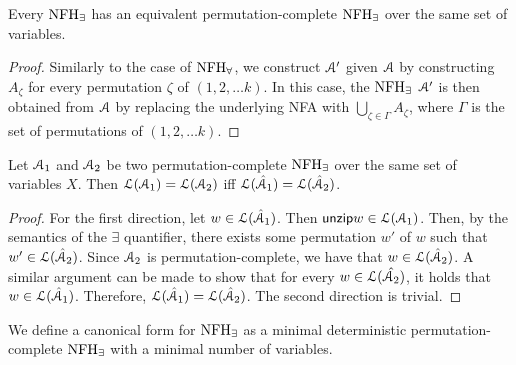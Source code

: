 \begin{lemma}
Every $\textrm{NFH}_{\exists}$ has an equivalent permutation-complete $\textrm{NFH}_{\exists}$ over the same set of variables. 
\end{lemma}
\begin{proof}
Similarly to the case of $\textrm{NFH}_{\forall}$, we construct $\mathcal{A}'$ given $\mathcal{A}$ by constructing $A_\zeta$ for every permutation $\zeta$ of $(1,2,\ldots k)$.
In this case, the $\textrm{NFH}_{\exists}$ $\mathcal{A}'$ is then obtained from $\mathcal{A}$ by replacing the underlying NFA with $\bigcup_{\zeta\in\Gamma} A_\zeta$, where $\Gamma$ is the set of permutations of $(1,2,\ldots k)$.
\end{proof}

\begin{lemma}
Let $\mathcal{A}_1$ and $\mathcal{A}_2$ be two permutation-complete $\textrm{NFH}_{\exists}$ over the same set of variables $X$.
Then $\mathcal{L}(\mathcal{A}_1)=\mathcal{L}(\mathcal{A}_2)$ iff  $\mathcal{L}(\hat{\mathcal{A}}_1) = \mathcal{L}(\hat {\mathcal{A}}_2)$.
\end{lemma}
\begin{proof}
For the first direction, let $w\in\mathcal{L}(\hat{\mathcal{A}}_1)$. Then $\mathsf{unzip}{w}\in\mathcal{L}(\mathcal{A}_1)$. 
Then, by the semantics of the $\exists$ quantifier, there exists some permutation $w'$ of $w$ such that $w'\in\mathcal{L}(\hat{\mathcal{A}}_2)$.
Since $\mathcal{A}_2$ is permutation-complete, we have that $w\in\mathcal{L}(\hat{\mathcal{A}}_2)$. A similar argument can be made to show that for every $w\in\mathcal{L}(\hat{\mathcal{A}_2})$, it holds that $w\in\mathcal{L}(\hat{\mathcal{A}}_1)$. Therefore, $\mathcal{L}(\hat{\mathcal{A}}_1) = \mathcal{L}(\hat {\mathcal{A}}_2)$.
The second direction is trivial.
\end{proof}

We define a canonical form for $\textrm{NFH}_{\exists}$ as a minimal deterministic permutation-complete $\textrm{NFH}_{\exists}$ with a minimal number of variables.




